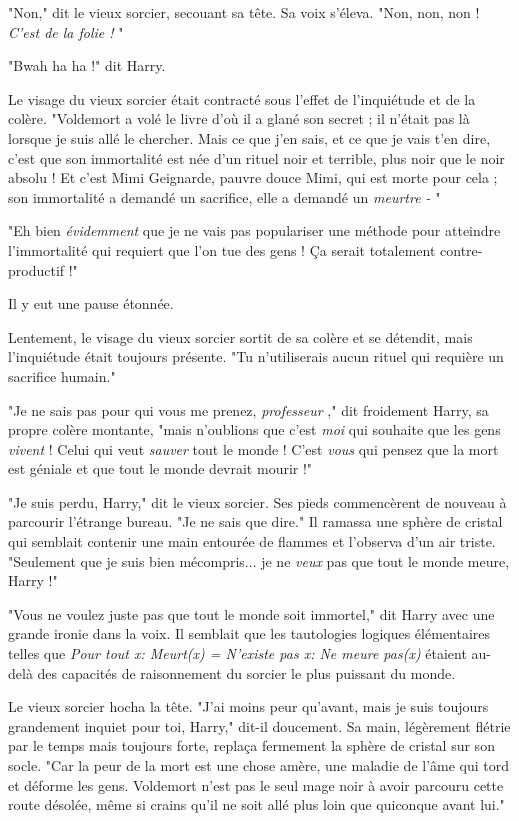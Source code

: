 "Non," dit le vieux sorcier, secouant sa tête. Sa voix s'éleva. "Non, non, non ! \emph{C'est de la folie !} "

"Bwah ha ha !" dit Harry.

Le visage du vieux sorcier était contracté sous l'effet de l'inquiétude et de la colère. "Voldemort a volé le livre d'où il a glané son secret ; il n'était pas là lorsque je suis allé le chercher. Mais ce que j'en sais, et ce que je vais t'en dire, c'est que son immortalité est née d'un rituel noir et terrible, plus noir que le noir absolu ! Et c'est Mimi Geignarde, pauvre douce Mimi, qui est morte pour cela ; son immortalité a demandé un sacrifice, elle a demandé un \emph{meurtre -} "

"Eh bien \emph{évidemment}  que je ne vais pas populariser une méthode pour atteindre l'immortalité qui requiert que l'on tue des gens ! Ça serait totalement contre-productif !"

Il y eut une pause étonnée.

Lentement, le visage du vieux sorcier sortit de sa colère et se détendit, mais l'inquiétude était toujours présente. "Tu n'utiliserais aucun rituel qui requière un sacrifice humain."

"Je ne sais pas pour qui vous me prenez, \emph{professeur} ," dit froidement Harry, sa propre colère montante, "mais n'oublions que c'est \emph{moi}  qui souhaite que les gens \emph{vivent}  ! Celui qui veut \emph{sauver}  tout le monde ! C'est \emph{vous}  qui pensez que la mort est géniale et que tout le monde devrait mourir !"

"Je suis perdu, Harry," dit le vieux sorcier. Ses pieds commencèrent de nouveau à parcourir l'étrange bureau. "Je ne sais que dire." Il ramassa une sphère de cristal qui semblait contenir une main entourée de flammes et l'observa d'un air triste. "Seulement que je suis bien mécompris... je ne \emph{veux}  pas que tout le monde meure, Harry !"

"Vous ne voulez juste pas que tout le monde soit immortel," dit Harry avec une grande ironie dans la voix. Il semblait que les tautologies logiques élémentaires telles que \emph{Pour tout x: Meurt(x) = N'existe pas x: Ne meure pas(x) } étaient au-delà des capacités de raisonnement du sorcier le plus puissant du monde.

Le vieux sorcier hocha la tête. "J'ai moins peur qu'avant, mais je suis toujours grandement inquiet pour toi, Harry," dit-il doucement. Sa main, légèrement flétrie par le temps mais toujours forte, replaça fermement la sphère de cristal sur son socle. "Car la peur de la mort est une chose amère, une maladie de l'âme qui tord et déforme les gens. Voldemort n'est pas le seul mage noir à avoir parcouru cette route désolée, même si crains qu'il ne soit allé plus loin que quiconque avant lui."

